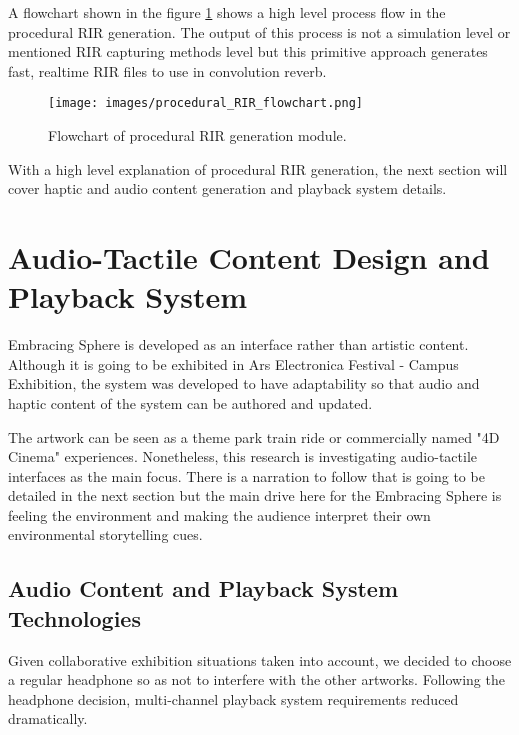         A flowchart shown in the figure \ref{fig:FLOW} shows a high level process flow in the procedural RIR generation. The output of this process is not a simulation level or mentioned RIR capturing methods level but this primitive approach generates fast, realtime RIR files to use in convolution reverb.\par
                
        \begin{figure}[H]
            \centering
            \texttt{[image: images/procedural\_RIR\_flowchart.png]}
            \caption{Flowchart of procedural RIR generation module.}
            \label{fig:FLOW}
        \end{figure}

        With a high level explanation of procedural RIR generation, the next section will cover haptic and audio content generation and playback system details.\par
    \section{Audio-Tactile Content Design and Playback System}
        Embracing Sphere is developed as an interface rather than artistic content. Although it is going to be exhibited in Ars Electronica Festival - Campus Exhibition, the system was developed to have adaptability so that audio and haptic content of the system can be authored and updated.\par

        The artwork can be seen as a theme park train ride or commercially named "4D Cinema" experiences. Nonetheless, this research is investigating audio-tactile interfaces as the main focus. There is a narration to follow that is going to be detailed in the next section but the main drive here for the Embracing Sphere is feeling the environment and making the audience interpret their own environmental storytelling cues.\par
        \subsection{Audio Content and Playback System Technologies}
            Given collaborative exhibition situations taken into account, we decided to choose a regular headphone so as not to interfere with the other artworks. Following the headphone decision, multi-channel playback system requirements reduced dramatically.\par

